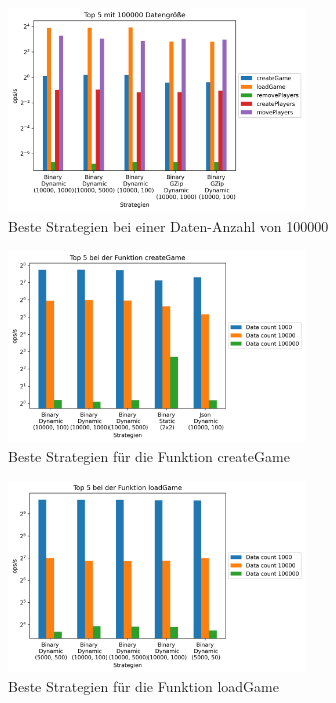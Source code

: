 \begin{figure}[htp]
    \centering
    \includegraphics[width=0.7\textwidth]{images/plots/100000.png}
    \caption{Beste Strategien bei einer Daten-Anzahl von 100000}
    \label{fig:bigDataCount}
\end{figure}

\begin{figure}[htp]
    \centering
    \includegraphics[width=0.7\textwidth]{images/plots/createGame.png}
    \caption{Beste Strategien für die Funktion createGame}
    \label{fig:createGame}
\end{figure}

\begin{figure}[htp]
    \centering
    \includegraphics[width=0.7\textwidth]{images/plots/loadGame.png}
    \caption{Beste Strategien für die Funktion loadGame}
    \label{fig:loadGame}
\end{figure}

